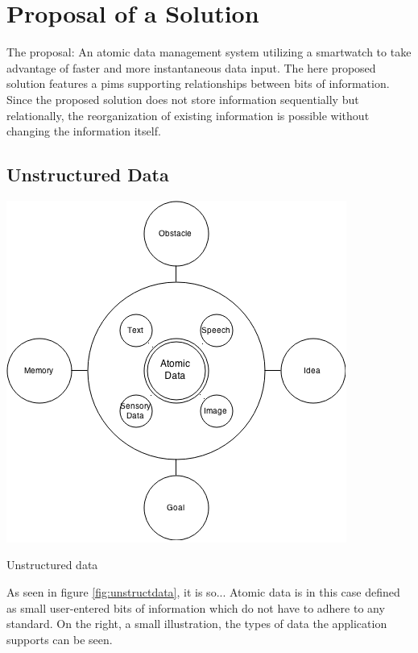 \section{Proposal of a Solution}

The proposal: An atomic data management system utilizing a smartwatch to take advantage of faster and more instantaneous data input.
The here proposed solution features a \gls{pims} supporting relationships
between bits of information. Since the proposed solution does not store
information sequentially but relationally, the reorganization of existing
information is possible without changing the information itself.

%
%

\subsection{Unstructured Data}

\begin{flfigure}
  \centering
    \includegraphics[width=0.9\linewidth]{00_resources/atomic_data.png}
    \caption{Unstructured data}
  \label{fig:unstructdata}
\end{flfigure}

As seen in figure \ref{fig:unstructdata}, it is so...
Atomic data is in this case defined as small user-entered bits of information which do not have to adhere to any standard.
On the right, a small illustration, the types of data the application supports can be seen.

